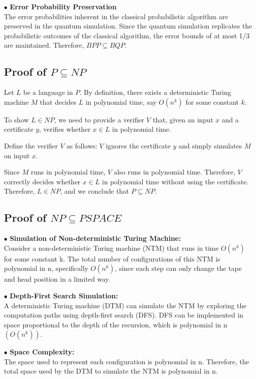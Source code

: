 \documentclass[a4paper]{article}
\begin{document}
\noindent $\bullet$ \textbf{Error Probability Preservation} \\
The error probabilities inherent in the classical probabilistic algorithm are preserved in the quantum simulation. Since the quantum simulation replicates the probabilistic outcomes of the classical algorithm, the error bounds of at most 1/3 are maintained.
Therefore, $BPP \subseteq BQP$.

\subsection{\textbf{Proof of $P \subseteq NP$}}
Let \( L \) be a language in \( P \). By definition, there exists a deterministic Turing machine \( M \) that decides \( L \) in polynomial time, say \( O(n^k) \) for some constant \( k \).

To show \( L \in NP \), we need to provide a verifier \( V \) that, given an input \( x \) and a certificate \( y \), verifies whether \( x \in L \) in polynomial time.

Define the verifier \( V \) as follows: \( V \) ignores the certificate \( y \) and simply simulates \( M \) on input \( x \).

Since \( M \) runs in polynomial time, \( V \) also runs in polynomial time. Therefore, \( V \) correctly decides whether \( x \in L \) in polynomial time without using the certificate.
Therefore, \( L \in NP \), and we conclude that \( P \subseteq NP \).

\subsection{\textbf{Proof of $NP \subseteq PSPACE$}}
\noindent $\bullet$ \textbf{Simulation of Non-deterministic Turing Machine:}\\
Consider a non-deterministic Turing machine (NTM) that runs in time $O(n^k)$ for some constant k.
The total number of configurations of this NTM is polynomial in n, specifically $O(n^k)$, since each step can only change the tape and head position in a limited way.

\noindent $\bullet$ \textbf{Depth-First Search Simulation:}\\
A deterministic Turing machine (DTM) can simulate the NTM by exploring the computation paths using depth-first search (DFS).
DFS can be implemented in space proportional to the depth of the recursion, which is polynomial in n $(O(n^k))$.

\noindent $\bullet$ \textbf{Space Complexity:}\\
The space used to represent each configuration is polynomial in n.
Therefore, the total space used by the DTM to simulate the NTM is polynomial in n.
\end{document}
